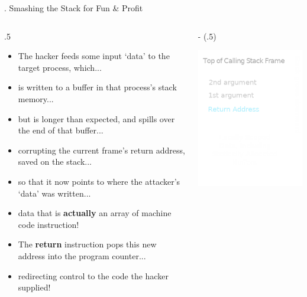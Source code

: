 \documentclass[9pt]{beamer}
\newcommand{\TwoCol}[3][.5] {
  \begin{columns}
    \begin{column}{#1\textwidth}
      #2
    \end{column}
    \begin{column}{\textwidth - (#1\textwidth)}
      #3
    \end{column}
  \end{columns}
}
\begin{document}
\begin{frame}{\theframenumber. Smashing the Stack for Fun \& Profit}
  \TwoCol {
      \small
      \begin{itemize}
      \item The hacker feeds some input `data' to the target process, which...
      \item is written to a buffer in that process's stack memory...
      \item but is longer than expected, and spills over the end of that buffer...
      \item corrupting the current frame's return address, saved on the stack...
      \item so that it now points to where the attacker's `data' was written...
      \item data that is \textbf{actually} an array of machine code instruction!
      \item The \textbf{return} instruction pops this new address into the program counter...
      \item redirecting control to the code the hacker supplied!
      \end{itemize}
  } {
      \includegraphics[width=\textwidth]{../images/stack_frame.png}
  
  }
\end{frame}
\end{document}
